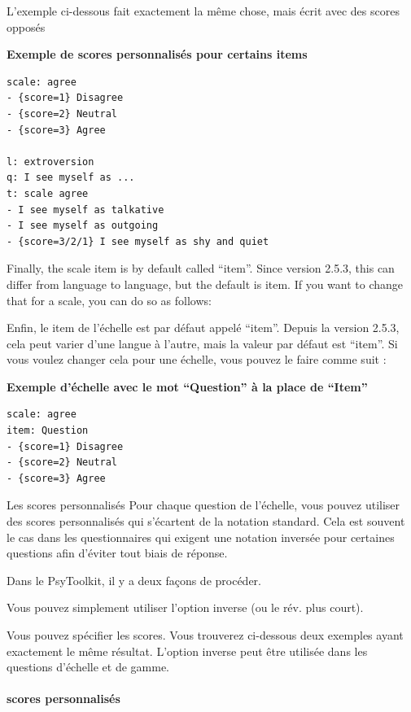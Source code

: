 \documentclass[
]{book}
\begin{document}
L'exemple ci-dessous fait exactement la même chose, mais écrit avec des
scores opposés

\textbf{Exemple de scores personnalisés pour certains items}

\begin{verbatim}
scale: agree
- {score=1} Disagree
- {score=2} Neutral
- {score=3} Agree

l: extroversion
q: I see myself as ...
t: scale agree
- I see myself as talkative
- I see myself as outgoing
- {score=3/2/1} I see myself as shy and quiet
\end{verbatim}

Finally, the scale item is by default called ``item''. Since version
2.5.3, this can differ from language to language, but the default is
item. If you want to change that for a scale, you can do so as follows:

Enfin, le item de l'échelle est par défaut appelé ``item''. Depuis la
version 2.5.3, cela peut varier d'une langue à l'autre, mais la valeur
par défaut est ``item''. Si vous voulez changer cela pour une échelle,
vous pouvez le faire comme suit :

\textbf{Exemple d'échelle avec le mot ``Question'' à la place de
``Item''}

\begin{verbatim}
scale: agree
item: Question
- {score=1} Disagree
- {score=2} Neutral
- {score=3} Agree
\end{verbatim}

Les scores personnalisés Pour chaque question de l'échelle, vous pouvez
utiliser des scores personnalisés qui s'écartent de la notation
standard. Cela est souvent le cas dans les questionnaires qui exigent
une notation inversée pour certaines questions afin d'éviter tout biais
de réponse.

Dans le PsyToolkit, il y a deux façons de procéder.

Vous pouvez simplement utiliser l'option inverse (ou le rév. plus
court).

Vous pouvez spécifier les scores. Vous trouverez ci-dessous deux
exemples ayant exactement le même résultat. L'option inverse peut être
utilisée dans les questions d'échelle et de gamme.

\hypertarget{scores-personnalisuxe9s}{%
\paragraph{scores personnalisés}\label{scores-personnalisuxe9s}}
\end{document}
